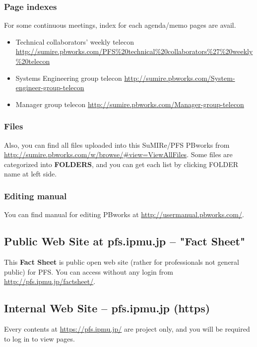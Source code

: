 \documentclass[a4paper,notitlepage]{article}
\begin{document}
\subsubsection{Page indexes}

For some continuous meetings, index for each agenda/memo pages are avail.

\begin{itemize}
  \item Technical collaborators' weekly telecon \url{http://sumire.pbworks.com/PFS%20technical%20collaborators%27%20weekly%20telecon}
  \item Systems Engineering group telecon \url{http://sumire.pbworks.com/System-engineer-group-telecon}
  \item Manager group telecon \url{http://sumire.pbworks.com/Manager-group-telecon}
\end{itemize}


\subsubsection{Files}

Also, you can find all files uploaded into this SuMIRe/PFS PBworks from 
\url{http://sumire.pbworks.com/w/browse/#view=ViewAllFiles}.
Some files are categorized into {\bf FOLDERS}, and you can get each list by 
clicking FOLDER name at left side. 

\subsubsection{Editing manual}

You can find manual for editing PBworks at 
\url{http://usermanual.pbworks.com/}. 


\subsection{Public Web Site at pfs.ipmu.jp -- "Fact Sheet"}

This {\bf Fact Sheet} is public open web site (rather for professionals 
not general public) for PFS. 
You can access without any login from \url{http://pfs.ipmu.jp/factsheet/}.

\subsection{Internal Web Site -- pfs.ipmu.jp (https)}

Every contents at \url{https://pfs.ipmu.jp/} are project only, and you will 
be required to log in to view pages. 
\end{document}
